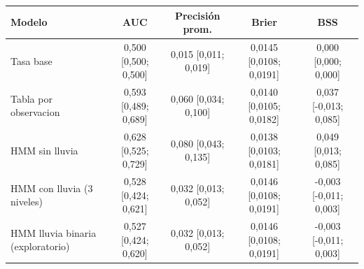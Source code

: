 \begin{tabular}{lcccc}
\toprule
Modelo & AUC & Precisión prom. & Brier & BSS \\
\midrule
Tasa base & 0,500 [0,500; 0,500] & 0,015 [0,011; 0,019] & 0,0145 [0,0108; 0,0191] & 0,000 [0,000; 0,000] \\
Tabla por observacion & 0,593 [0,489; 0,689] & 0,060 [0,034; 0,100] & 0,0140 [0,0105; 0,0182] & 0,037 [-0,013; 0,085] \\
HMM sin lluvia & 0,628 [0,525; 0,729] & 0,080 [0,043; 0,135] & 0,0138 [0,0103; 0,0181] & 0,049 [0,013; 0,085] \\
HMM con lluvia (3 niveles) & 0,528 [0,424; 0,621] & 0,032 [0,013; 0,052] & 0,0146 [0,0108; 0,0191] & -0,003 [-0,011; 0,003] \\
HMM lluvia binaria (exploratorio) & 0,527 [0,424; 0,620] & 0,032 [0,013; 0,052] & 0,0146 [0,0108; 0,0191] & -0,003 [-0,011; 0,003] \\
\bottomrule
\end{tabular}